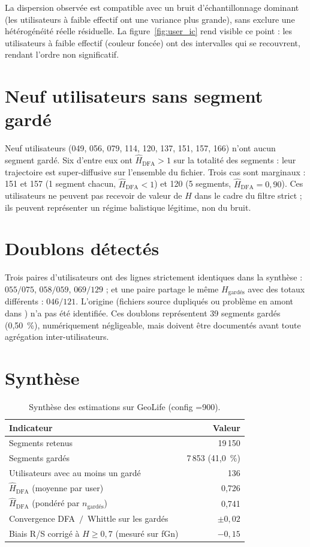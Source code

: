 \documentclass[12pt,a4paper]{report}
\theoremstyle{definition}
\DeclareRobustCommand{\code}[1]{\texorpdfstring{\texttt{\detokenize{#1}}}{\detokenize{#1}}}
\begin{document}
La dispersion observée est compatible avec un bruit d'échantillonnage dominant (les
utilisateurs à faible effectif ont une variance plus grande), sans exclure une
hétérogénéité réelle résiduelle. La figure~\ref{fig:user_ic} rend visible ce point :
les utilisateurs à faible effectif (couleur foncée) ont des intervalles qui se
recouvrent, rendant l'ordre non significatif.

\section{Neuf utilisateurs sans segment gardé}

Neuf utilisateurs (049, 056, 079, 114, 120, 137, 151, 157, 166) n'ont aucun segment gardé.
Six d'entre eux ont $\hat H_{\mathrm{DFA}} > 1$ sur la totalité des segments : leur
trajectoire est super-diffusive sur l'ensemble du fichier. Trois cas sont marginaux :
151 et 157 (1 segment chacun, $\hat H_{\mathrm{DFA}} < 1$) et 120 (5 segments,
$\hat H_{\mathrm{DFA}} = 0{,}90$). Ces utilisateurs ne peuvent pas recevoir de valeur de
$H$ dans le cadre du filtre strict ; ils peuvent représenter un régime balistique légitime,
non du bruit.

\section{Doublons détectés}

Trois paires d'utilisateurs ont des lignes strictement identiques dans la synthèse :
$055/075$, $058/059$, $069/129$ ; et une paire partage le même $H_{\text{gardés}}$ avec des
totaux différents : $046/121$. L'origine (fichiers source dupliqués ou problème en amont
dans \code{resultats_H/}) n'a pas été identifiée. Ces doublons représentent 39 segments
gardés (0,50~\%), numériquement négligeable, mais doivent être documentés avant toute
agrégation inter-utilisateurs.

\section{Synthèse}

\begin{table}[ht]
\centering
\caption{Synthèse des estimations sur GeoLife (config \code{TIME_GAP}=900).}
\label{tab:synthese}
\small
\begin{tabular}{lr}
\toprule
Indicateur & Valeur \\
\midrule
Segments retenus & 19\,150 \\
Segments gardés & 7\,853 (41,0~\%) \\
Utilisateurs avec au moins un gardé & 136 \\
$\hat H_{\mathrm{DFA}}$ (moyenne par user) & 0{,}726 \\
$\hat H_{\mathrm{DFA}}$ (pondéré par $n_{\text{gardés}}$) & 0{,}741 \\
Convergence DFA~$/$~Whittle sur les gardés & $\pm 0{,}02$ \\
Biais R/S corrigé à $H \ge 0{,}7$ (mesuré sur fGn) & $-0{,}15$ \\
\bottomrule
\end{tabular}
\end{table}
\end{document}
